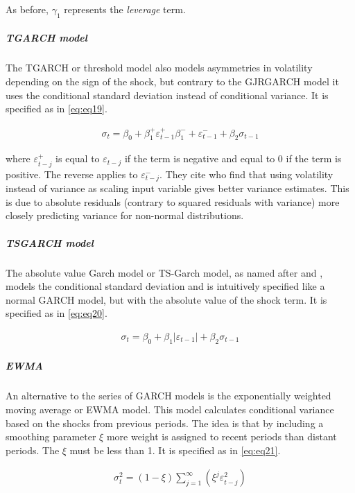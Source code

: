 \documentclass[a4paper, nobind]{templates/ociamthesis}
\begin{document}
As before, \(\gamma_1\) represents the \emph{leverage} term.

\hypertarget{tgarch-model}{%
\subparagraph{TGARCH model}\label{tgarch-model}}

\noindent The TGARCH or threshold model \autocite{zakoian1994} also models asymmetries in volatility depending on the sign of the shock, but contrary to the GJRGARCH model it uses the conditional standard deviation instead of conditional variance. It is specified as in \eqref{eq:eq19}.

\begin{align}
\sigma_t = \beta_0 + \beta_1^+ \varepsilon_{t-1}^+ \beta_1^{-} + \varepsilon_{t-1}^{-} + \beta_2 \sigma_{t-1}
 \label{eq:eq19}
\end{align}

\noindent where \(\varepsilon_{t-j}^+\) is equal to \(\varepsilon_{t-j}\) if the term is negative and equal to 0 if the term is positive. The reverse applies to \(\varepsilon_{t-j}^-\). They cite \textcite{davidian1987} who find that using volatility instead of variance as scaling input variable gives better variance estimates. This is due to absolute residuals (contrary to squared residuals with variance) more closely predicting variance for non-normal distributions.

\hypertarget{tsgarch-model}{%
\subparagraph{TSGARCH model}\label{tsgarch-model}}

\noindent The absolute value Garch model or TS-Garch model, as named after \textcite{taylor1986} and \textcite{schwert1989}, models the conditional standard deviation and is intuitively specified like a normal GARCH model, but with the absolute value of the shock term. It is specified as in \eqref{eq:eq20}.

\begin{align}
\sigma_t = \beta_0 + \beta_1 \left|\varepsilon_{t-1}\right| + \beta_2 \sigma_{t-1}
 \label{eq:eq20}
\end{align}

\hypertarget{ewma}{%
\subparagraph{EWMA}\label{ewma}}

\noindent An alternative to the series of GARCH models is the exponentially weighted moving average or EWMA model. This model calculates conditional variance based on the shocks from previous periods. The idea is that by including a smoothing parameter \(\xi\) more weight is assigned to recent periods than distant periods. The \(\xi\) must be less than 1. It is specified as in \eqref{eq:eq21}.

\begin{align}
\sigma_t^2 = (1-\xi) \sum\limits_{j=1}^\infty (\xi^j \varepsilon_{t-j}^2)
 \label{eq:eq21}
\end{align}
\end{document}
